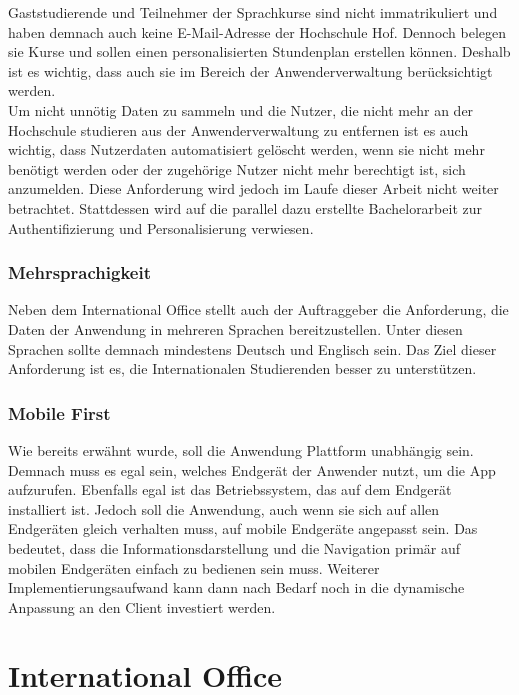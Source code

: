 Gaststudierende und Teilnehmer der Sprachkurse sind nicht immatrikuliert und haben demnach auch keine E-Mail-Adresse der Hochschule Hof. Dennoch belegen sie Kurse und sollen einen personalisierten Stundenplan erstellen können. Deshalb ist es wichtig, dass auch sie im Bereich der Anwenderverwaltung berücksichtigt werden. 
\\
\linebreak
Um nicht unnötig Daten zu sammeln und die Nutzer, die nicht mehr an der Hochschule studieren aus der Anwenderverwaltung zu entfernen ist es auch wichtig, dass Nutzerdaten automatisiert gelöscht werden, wenn sie nicht mehr benötigt werden oder der zugehörige Nutzer nicht mehr berechtigt ist, sich anzumelden. Diese Anforderung wird jedoch im Laufe dieser Arbeit nicht weiter betrachtet. Stattdessen wird auf die parallel dazu erstellte Bachelorarbeit zur Authentifizierung und Personalisierung verwiesen\autocite[][]{andreasba}.

\subsubsection{Mehrsprachigkeit}

Neben dem International Office stellt auch der Auftraggeber die Anforderung, die Daten der Anwendung in mehreren Sprachen bereitzustellen. Unter diesen Sprachen sollte demnach mindestens Deutsch und Englisch sein. Das Ziel dieser Anforderung ist es, die Internationalen Studierenden besser zu unterstützen.

\subsubsection{Mobile First}

Wie bereits erwähnt wurde, soll die Anwendung Plattform unabhängig sein. Demnach muss es egal sein, welches Endgerät der Anwender nutzt, um die \ac{App} aufzurufen. Ebenfalls egal ist das Betriebssystem, das auf dem Endgerät installiert ist. Jedoch soll die Anwendung, auch wenn sie sich auf allen Endgeräten gleich verhalten muss, auf mobile Endgeräte angepasst sein. Das bedeutet, dass die Informationsdarstellung und die Navigation primär auf mobilen Endgeräten einfach zu bedienen sein muss. Weiterer Implementierungsaufwand kann dann nach Bedarf noch in die 
dynamische Anpassung an den Client investiert werden.

\section{International Office\label{sec:anforderungen_io}}

